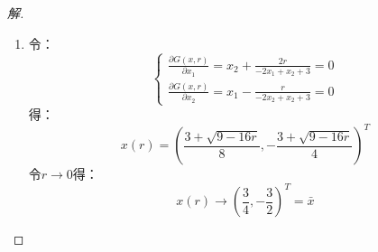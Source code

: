 \documentclass[a4paper,12pt]{article}
\begin{document}
\begin{proof}[解]
\begin{enumerate}[(1)]
		\item 令：
		\begin{equation}
		\left\{
		\begin{array}{c}
		\frac{\partial G(x,r)}{\partial x_1} =x_2+\frac{2r}{-2x_1+x_2+3}=0 \\
		\frac{\partial G(x,r)}{\partial x_2} =x_1-\frac{r}{-2x_2+x_2+3}=0
		\end{array}
		\right.
		\end{equation}
		得：
		\begin{equation}
		x(r)=\left(\frac{3+\sqrt{9-16r}}{8},-\frac{3+\sqrt{9-16r}}{4}\right)^T
		\end{equation}
		令$r\to 0$得：
		\begin{equation}
		x(r)\to \left(\frac{3}{4},-\frac{3}{2}\right)^T=\bar{x}
		\end{equation}
	\end{enumerate}
\end{proof}
\end{document}
